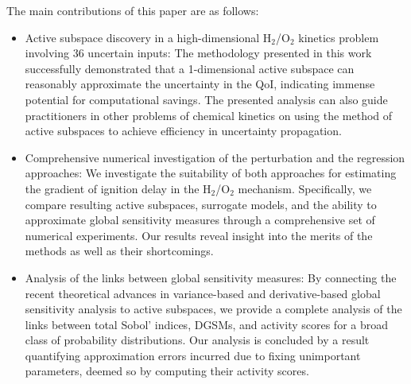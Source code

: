 The main contributions of this paper are as follows: 
\begin{itemize}
\item 
Active subspace
discovery in a high-dimensional H$_2$/O$_2$ kinetics problem involving 36
uncertain inputs: The methodology presented in this work
successfully demonstrated that a 1-dimensional active subspace can reasonably 
approximate the uncertainty in the QoI, indicating immense potential
for computational savings. The presented
analysis can also guide practitioners in other problems of chemical kinetics on using the
method of active subspaces to achieve efficiency in uncertainty propagation.  
\item Comprehensive numerical investigation of the perturbation and the regression approaches: 
We investigate the suitability of both approaches
for estimating the gradient of ignition delay in the H$_2$/O$_2$ mechanism.
Specifically, we compare resulting
active subspaces, surrogate models, and the ability to approximate global
sensitivity measures through a comprehensive set of numerical experiments. Our
results reveal insight into the merits of the methods as well as
their shortcomings.  
\item Analysis of the links between  
global sensitivity measures: 
By connecting the recent theoretical advances in variance-based and
derivative-based global sensitivity analysis to active subspaces, we provide a complete analysis
of the links between total Sobol' indices, DGSMs, and activity scores for a broad
class of probability distributions. Our analysis is concluded by a result quantifying
approximation errors incurred due to fixing unimportant parameters, deemed so by 
computing their activity scores.  

\end{itemize}

